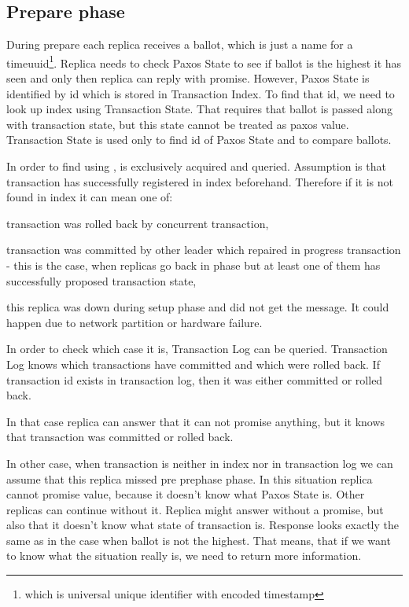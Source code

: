 \subsection{Prepare phase}
During prepare each replica receives a ballot, which is just a name for a timeuuid\footnote{which is universal unique identifier with encoded timestamp}. Replica needs to check Paxos State to see if ballot is the highest it has seen and only then replica can reply with promise. However, Paxos State is identified by id which is stored in Transaction Index. To find that id, we need to look up index using Transaction State. That requires that ballot is passed along with transaction state, but this state cannot be treated as paxos value. Transaction State is used only to find id of Paxos State and to compare ballots.

In order to find \paxosRoundId using \txState, \txIndex is exclusively acquired and queried. Assumption is that transaction has successfully registered in index beforehand. Therefore if it is not found in index it can mean one of:
\begin{enumerate*}
\item transaction was rolled back by concurrent transaction,
\item transaction was committed by other leader which repaired in progress transaction - this is the case, when replicas go back in phase but at least one of them has successfully proposed transaction state,
\item this replica was down during setup phase and did not get the message. It could happen due to network partition or hardware failure.
\end{enumerate*}


In order to check which case it is, Transaction Log can be queried. Transaction Log knows which transactions have committed and which were rolled back. If transaction id exists in transaction log, then it was either committed or rolled back.


In that case replica can answer that it can not promise anything, but it knows that transaction was committed or rolled back.


In other case, when transaction is neither in index nor in transaction log we can assume that this replica missed pre prephase phase. In this situation replica cannot promise value, because it doesn’t know what Paxos State is. Other replicas can continue without it. Replica might answer without a promise, but also that it doesn’t know what state of transaction is. Response looks exactly the same as in the case when ballot is not the highest. That means, that if we want to know what the situation really is, we need to return more information.


